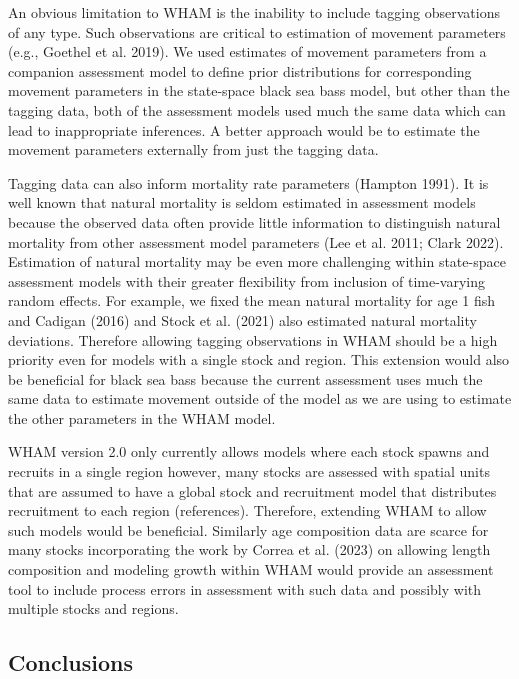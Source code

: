 \documentclass[
]{article}
\begin{document}
An obvious limitation to WHAM is the inability to include tagging
observations of any type. Such observations are critical to estimation
of movement parameters (e.g., Goethel et al. 2019). We used estimates of
movement parameters from a companion assessment model to define prior
distributions for corresponding movement parameters in the state-space
black sea bass model, but other than the tagging data, both of the
assessment models used much the same data which can lead to
inappropriate inferences. A better approach would be to estimate the
movement parameters externally from just the tagging data.

Tagging data can also inform mortality rate parameters (Hampton 1991).
It is well known that natural mortality is seldom estimated in
assessment models because the observed data often provide little
information to distinguish natural mortality from other assessment model
parameters (Lee et al. 2011; Clark 2022). Estimation of natural
mortality may be even more challenging within state-space assessment
models with their greater flexibility from inclusion of time-varying
random effects. For example, we fixed the mean natural mortality for age
1 fish and Cadigan (2016) and Stock et al. (2021) also estimated natural
mortality deviations. Therefore allowing tagging observations in WHAM
should be a high priority even for models with a single stock and
region. This extension would also be beneficial for black sea bass
because the current assessment uses much the same data to estimate
movement outside of the model as we are using to estimate the other
parameters in the WHAM model.

WHAM version 2.0 only currently allows models where each stock spawns
and recruits in a single region however, many stocks are assessed with
spatial units that are assumed to have a global stock and recruitment
model that distributes recruitment to each region (references).
Therefore, extending WHAM to allow such models would be beneficial.
Similarly age composition data are scarce for many stocks incorporating
the work by Correa et al. (2023) on allowing length composition and
modeling growth within WHAM would provide an assessment tool to include
process errors in assessment with such data and possibly with multiple
stocks and regions.

\hypertarget{conclusions}{%
\subsection*{Conclusions}\label{conclusions}}
\end{document}

